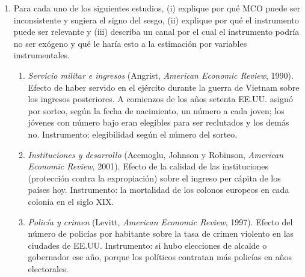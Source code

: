 \documentclass[letterpaper,11pt]{article}
\begin{document}
\begin{enumerate}[itemsep=0.8em]
\item Para cada uno de los siguientes estudios, (i) explique por qué MCO puede ser inconsistente
    y sugiera el signo del sesgo, (ii) explique por qué el instrumento puede ser relevante y
    (iii) describa un canal por el cual el instrumento podría no ser exógeno y qué le haría esto
    a la estimación por variables instrumentales.
    \begin{enumerate}
        \item \emph{Servicio militar e ingresos} (Angrist, \textit{American Economic Review}, 1990).
            Efecto de haber servido en el ejército durante la guerra de Vietnam sobre los
            ingresos posteriores. A comienzos de los años setenta EE.UU. asignó por sorteo, según la fecha de
            nacimiento, un número a cada joven; los jóvenes con número bajo
            eran elegibles para ser reclutados y los demás no. Instrumento: elegibilidad según el
            número del sorteo.
        \item \emph{Instituciones y desarrollo} (Acemoglu, Johnson y Robinson,
            \textit{American Economic Review}, 2001). Efecto de la calidad de las instituciones
            (protección contra la expropiación) sobre el ingreso per cápita de los países hoy.
            Instrumento: la mortalidad de los colonos europeos en cada colonia en el siglo XIX.
        \item \emph{Policía y crimen} (Levitt, \textit{American Economic Review}, 1997). Efecto
            del número de policías por habitante sobre la tasa de crimen violento en las ciudades
            de EE.UU. Instrumento: si hubo elecciones de alcalde o gobernador ese año, porque los
            políticos contratan más policías en años electorales.
    \end{enumerate}


\end{enumerate}
\end{document}
